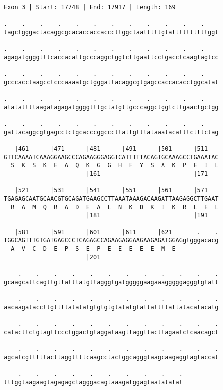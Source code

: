 \documentclass{article}
\begin{document}
\newpage
\begin{Verbatim}[fontfamily=courier]
Exon 3 | Start: 17748 | End: 17917 | Length: 169

.    .    .    .    .    .    .    .    .    .    .    .    
tagctgggactacaggcgcacaccaccacccttggctaatttttgtattttttttttggt

.    .    .    .    .    .    .    .    .    .    .    .    
agagatggggtttcaccacattgcccaggctggtcttgaattcctgacctcaagtagtcc

.    .    .    .    .    .    .    .    .    .    .    .    
gcccacctaagcctcccaaaatgctgggattacaggcgtgagccaccacacctggcatat

.    .    .    .    .    .    .    .    .    .    .    .    
atatattttaagatagagatggggtttgctatgttgcccaggctggtcttgaactgctgg

.    .    .    .    .    .    .    .    .    .    .    .    
gattacaggcgtgagcctctgcacccggcccttattgtttataaatacatttctttctag

   |461      |471      |481      |491      |501      |511   
GTTCAAAATCAAAGGAAGCCCAGAAGGGAGGTCATTTTTACAGTGCAAAGCCTGAAATAC
  S  K  S  K  E  A  Q  K  G  G  H  F  Y  S  A  K  P  E  I  L
                       |161                          |171   

   |521      |531      |541      |551      |561      |571   
TGAGAGCAATGCAACGTGCAGATGAAGCCTTAAATAAAGACAAGATTAAGAGGCTTGAAT
  R  A  M  Q  R  A  D  E  A  L  N  K  D  K  I  K  R  L  E  L
                       |181                          |191   

   |581      |591      |601      |611      |621       .    .
TGGCAGTTTGTGATGAGCCCTCAGAGCCAGAAGAGGAAGAAGAGATGGAGgtgggacacg
  A  V  C  D  E  P  S  E  P  E  E  E  E  E  M  E            
                       |201                                 

    .    .    .    .    .    .    .    .    .    .    .    .
gcaagcattcagttgttatttatgttagggtgatgggggaagaaagggggagggtgtatt

    .    .    .    .    .    .    .    .    .    .    .    .
aacaagataccttgttttatatatgtgtgtgtatatgtattattttattatacatacatg

    .    .    .    .    .    .    .    .    .    .    .    .
catacttctgtagttccctggactgtaggataagttaggttacttagaatctcaacagct

    .    .    .    .    .    .    .    .    .    .    .    .
agcatcgtttttacttaggttttcaagcctactggcagggtaagcaagaggtagtaccat

    .    .    .    .    .    .    .    .    .    .
tttggtaagaagtagagagctagggacagtaaagatggagtaatatatat
\end{Verbatim}
\end{document}
